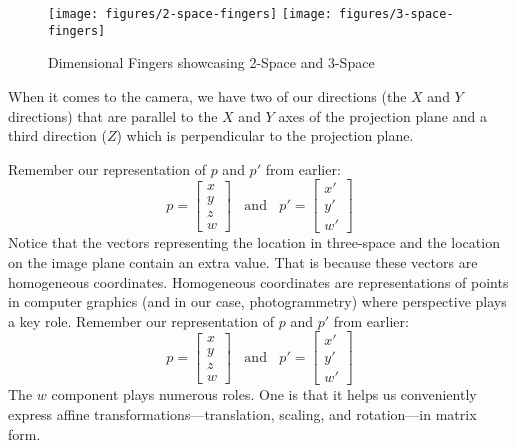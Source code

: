 \documentclass[
    12pt,
    twoside,
    bibstyle=chicago,
    headerstyle=uppercase,
	bibfile=biblatex_updating.bib
]{reedthesis}
\begin{document}
\begin{figure}[t]
	   
	       \centering
	    
	    \texttt{[image: figures/2-space-fingers]} 
		\hfill	    
	    \texttt{[image: figures/3-space-fingers]}
	     \caption{Dimensional Fingers showcasing 2-Space and 3-Space}
	 \label{Dimensional Fingers}
	\end{figure}

When it comes to the camera, we have two of our directions (the $X$ and $Y$ directions) that are parallel to the $X$ and $Y$ axes of the projection plane and a third direction ($Z$) which is perpendicular to the projection plane. 

Remember our representation of $p$ and $p'$ from earlier: \[p = \left[\begin{smallmatrix}x\\y\\z\\w\end{smallmatrix}\right]\;\; \text{ and }\;\; p' = \left[\begin{smallmatrix}x'\\y'\\w'\end{smallmatrix}\right]\] Notice that the vectors representing the location in three-space and the location on the image plane contain an extra value. That is because these vectors are homogeneous coordinates. Homogeneous coordinates are representations of points in computer graphics (and in our case, photogrammetry) where perspective plays a key role. Remember our representation of $p$ and $p'$ from earlier: \[p = \left[\begin{smallmatrix}x\\y\\z\\w\end{smallmatrix}\right]\;\; \text{ and }\;\; p' = \left[\begin{smallmatrix}x'\\y'\\w'\end{smallmatrix}\right]\] The $w$ component plays numerous roles. One is that it helps us conveniently express affine transformations---translation, scaling, and rotation---in matrix form.

\end{document}
